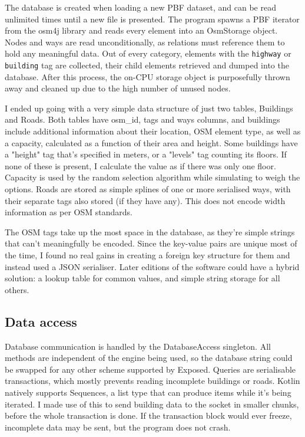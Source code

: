 \label{pbf-loading}
The database is created when loading a new PBF dataset, and can be read unlimited times until a new file is presented. The program spawns a PBF iterator from the osm4j library and reads every element into an OsmStorage object. Nodes and ways are read unconditionally, as relations must reference them to hold any meaningful data. Out of every category, elements with the \verb|highway| or \verb|building| tag are collected, their child elements retrieved and dumped into the database. After this process, the on-CPU storage object is purposefully thrown away and cleaned up due to the high number of unused nodes.

I ended up going with a very simple data structure of just two tables, Buildings and Roads. Both tables have osm\_id, tags and ways columns, and buildings include additional information about their location, OSM element type, as well as a capacity, calculated as a function of their area and height. Some buildings have a "height" tag that's specified in meters, or a "levels" tag counting its floors. If none of these is present, I calculate the value as if there was only one floor. Capacity is used by the random selection algorithm while simulating to weigh the options. Roads are stored as simple splines of one or more serialised ways, with their separate tags also stored (if they have any). This does not encode width information as per OSM standards.

The OSM tags take up the most space in the database, as they're simple strings that can't meaningfully be encoded. Since the key-value pairs are unique most of the time, I found no real gains in creating a foreign key structure for them and instead used a JSON serialiser. Later editions of the software could have a hybrid solution: a lookup table for common values, and simple string storage for all others.

\subsection{Data access}

Database communication is handled by the DatabaseAccess singleton. All methods are independent of the engine being used, so the database string could be swapped for any other scheme supported by Exposed. Queries are serialisable transactions, which mostly prevents reading incomplete buildings or roads. Kotlin natively supports Sequences, a list type that can produce items while it's being iterated. I made use of this to send building data to the socket in smaller chunks, before the whole transaction is done. If the transaction block would ever freeze, incomplete data may be sent, but the program does not crash.

